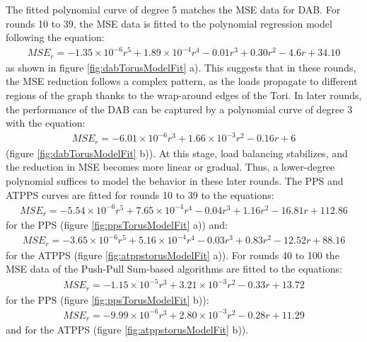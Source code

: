 The fitted polynomial curve of degree 5 matches the MSE data for DAB. For rounds 10 to 39, the MSE data is fitted to the polynomial regression model following the equation: 
\begin{align}
    MSE_r=-1.35\times 10^{-6}r^{5}+ 1.89\times 10^{-4}r^{4}-0.01r^{3}+0.30r^{2}-4.6r+34.10    
\end{align}
as shown in figure \ref{fig:dabTorusModelFit} a). This suggests that in these rounds, the MSE reduction follows a complex pattern, as the loads propagate to different regions of the graph thanks to the wrap-around edges of the Tori. In later rounds, the performance of the DAB can be captured by a polynomial curve of degree 3 with the equation:
\begin{align}
    MSE_r=-6.01\times 10^{-6}r^{3}+1.66\times 10^{-3}r^{2}-0.16r+6    
\end{align}
(figure \ref{fig:dabTorusModelFit} b)). At this stage, load balancing stabilizes, and the reduction in MSE becomes more linear or gradual. Thus, a lower-degree polynomial suffices to model the behavior in these later rounds. The PPS and ATPPS curves are fitted for rounds 10 to 39 to the equations:
\begin{align}
    MSE_r=-5.54\times 10^{-6}r^{5}+7.65\times 10^{-4}r^{4}-0.04r^{3}+1.16r^{2}-16.81r+112.86    
\end{align}
for the PPS (figure \ref{fig:ppsTorusModelFit} a)) and:
\begin{align}
    MSE_r = -3.65 \times 10^{-6}r^{5} + 5.16 \times 10^{-4}r^{4} - 0.03r^{3} + 0.83r^{2} - 12.52r + 88.16    
\end{align}
for the ATPPS (figure \ref{fig:atppstorusModelFit} a)). For rounds 40 to 100 the MSE data of the Push-Pull Sum-based algorithms are fitted to the equations: 
\begin{align}
    MSE_r = -1.15 \times 10^{-5}r^{3} + 3.21\times 10^{-3}r^{2} - 0.33r + 13.72    
\end{align}
for the PPS (figure \ref{fig:ppsTorusModelFit} b)):
\begin{align}
    MSE_r = -9.99 \times 10^{-6}r^{3} + 2.80\times 10^{-3}r^{2} - 0.28r + 11.29    
\end{align}
and for the ATPPS (figure \ref{fig:atppstorusModelFit} b)).

